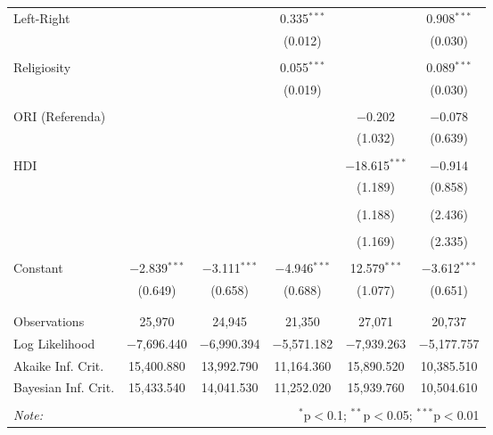 \begin{table}[!htbp]
\begin{tabular}{@{\extracolsep{5pt}}lccccc}
 Left-Right &  &  & 0.335$^{***}$ &  & 0.908$^{***}$ \\ 
  &  &  & (0.012) &  & (0.030) \\ 
  & & & & & \\ 
 Religiosity &  &  & 0.055$^{***}$ &  & 0.089$^{***}$ \\ 
  &  &  & (0.019) &  & (0.030) \\ 
  & & & & & \\ 
 ORI (Referenda) &  &  &  & $-$0.202 & $-$0.078 \\ 
  &  &  &  & (1.032) & (0.639) \\ 
  & & & & & \\ 
 HDI &  &  &  & $-$18.615$^{***}$ & $-$0.914 \\ 
  &  &  &  & (1.189) & (0.858) \\ 
  & & & & & \\ 
  &  &  &  & (1.188) & (2.436) \\ 
  & & & & & \\ 
  &  &  &  & (1.169) & (2.335) \\ 
  & & & & & \\ 
 Constant & $-$2.839$^{***}$ & $-$3.111$^{***}$ & $-$4.946$^{***}$ & 12.579$^{***}$ & $-$3.612$^{***}$ \\ 
  & (0.649) & (0.658) & (0.688) & (1.077) & (0.651) \\ 
  & & & & & \\ 
\hline \\[-1.8ex] 
Observations & 25,970 & 24,945 & 21,350 & 27,071 & 20,737 \\ 
Log Likelihood & $-$7,696.440 & $-$6,990.394 & $-$5,571.182 & $-$7,939.263 & $-$5,177.757 \\ 
Akaike Inf. Crit. & 15,400.880 & 13,992.790 & 11,164.360 & 15,890.520 & 10,385.510 \\ 
Bayesian Inf. Crit. & 15,433.540 & 14,041.530 & 11,252.020 & 15,939.760 & 10,504.610 \\ 
\hline 
\hline \\[-1.8ex] 
\textit{Note:}  & \multicolumn{5}{r}{$^{*}$p$<$0.1; $^{**}$p$<$0.05; $^{***}$p$<$0.01} \\ 
\end{tabular} 
\end{table} 
